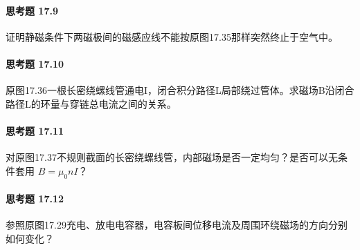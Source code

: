 \paragraph{思考题 17.9}
证明静磁条件下两磁极间的磁感应线不能按原图17.35那样突然终止于空气中。

\paragraph{思考题 17.10}
原图17.36一根长密绕螺线管通电I，闭合积分路径L局部绕过管体。求磁场B沿闭合路径L的环量与穿链总电流之间的关系。

\paragraph{思考题 17.11}
对原图17.37不规则截面的长密绕螺线管，内部磁场是否一定均匀？是否可以无条件套用 \(B=\mu_0 nI\)？

\paragraph{思考题 17.12}
参照原图17.29充电、放电电容器，电容板间位移电流及周围环绕磁场的方向分别如何变化？
